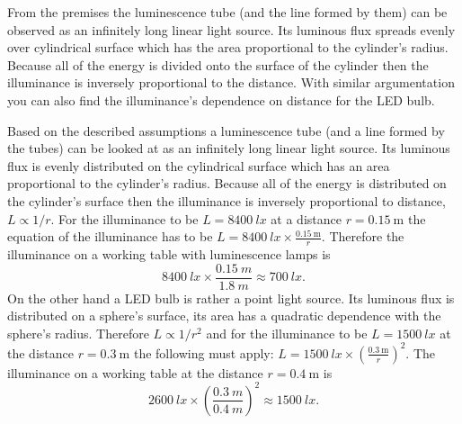{\ifEngHint
From the premises the luminescence tube (and the line formed by them) can be observed as an infinitely long linear light source. Its luminous flux spreads evenly over cylindrical surface which has the area proportional to the cylinder’s radius. Because all of the energy is divided onto the surface of the cylinder then the illuminance is inversely proportional to the distance. With similar argumentation you can also find the illuminance’s dependence on distance for the LED bulb.
\fi


\ifEngSolution
Based on the described assumptions a luminescence tube (and a line formed by the tubes) can be looked at as an infinitely long linear light source. Its luminous flux is evenly distributed on the cylindrical surface which has an area proportional to the cylinder’s radius. Because all of the energy is distributed on the cylinder’s surface then the illuminance is inversely proportional to distance, $L \propto 1/r$. For the illuminance to be $L=\SI{8400}{lx}$ at a distance $r=\SI{0.15}{\meter}$ the equation of the illuminance has to be $L=\SI{8400}{lx}\times \frac{\SI{0.15}{\meter}} r$. Therefore the illuminance on a working table with luminescence lamps is 
\[
\SI{8400}{lx}\times\frac{\SI{0.15}{m}}{\SI{1.8}{m}}\approx\SI{700}{lx}.
\]
On the other hand a LED bulb is rather a point light source. Its luminous flux is distributed on a sphere’s surface, its area has a quadratic dependence with the sphere’s radius. Therefore $L \propto 1/r^2$ and for the illuminance to be $L=\SI{1500}{lx}$ at the distance $r=\SI{0.3}{\meter}$ the following must apply: $L=\SI{1500}{lx}\times \left(\frac{\SI{0.3}{\meter}} {r}\right)^2$. The illuminance on a working table at the distance $r=\SI{0.4}{\meter}$ is
\[
\SI{2600}{lx}\times\left(\frac{\SI{0.3}{m}}{\SI{0.4}{m}}\right)^2\approx\SI{1500}{lx}.
\]
\fi
}